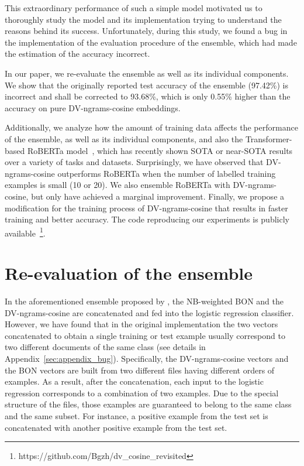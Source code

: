 \documentclass[11pt]{article}
\begin{document}
This extraordinary performance of such a simple model motivated us to thoroughly study the model and its implementation trying to understand the reasons behind its success. Unfortunately, during this study, we found a bug in the implementation of the evaluation procedure of the ensemble, which had made the estimation of the accuracy incorrect.

In our paper, we re-evaluate the ensemble as well as its individual components. We
show that the originally reported test accuracy of the ensemble (97.42\%) is incorrect and shall be corrected to 93.68\%, which is only 0.55\% higher than the accuracy on pure DV-ngrams-cosine embeddings. 

Additionally, we analyze how the amount of training data affects the performance of the ensemble, as well as its individual components, and also the Transformer-based RoBERTa model~\cite{liu2020roberta}, which has recently shown SOTA or near-SOTA results over a variety of tasks and datasets. Surprisingly, we have observed that DV-ngrams-cosine outperforms RoBERTa when the number of labelled training examples is small (10 or 20). We also ensemble RoBERTa with DV-ngrams-cosine, but only have achieved a marginal improvement. Finally, we propose a modification for the training process of DV-ngrams-cosine that results in faster training and better accuracy. The code reproducing our experiments is publicly available~\footnote{https://github.com/Bgzh/dv\_cosine\_revisited}.

\section{Re-evaluation of the ensemble}
\label{sec:ens_n_problem}
In the aforementioned ensemble proposed by \citet{thongtan-phienthrakul-2019-sentiment}, the NB-weighted BON and the DV-ngrams-cosine are concatenated and fed into the logistic regression classifier. 
However, we have found that in the original implementation the two vectors concatenated to obtain a single training or test example usually correspond to two different documents of the same class (see details in Appendix~\ref{sec:appendix_bug}). Specifically, the DV-ngrams-cosine vectors and the BON vectors are built from two different files having different orders of examples. As a result, after the concatenation, each input to the logistic regression corresponds to a combination of two examples. Due to the special structure of the files, those examples are guaranteed to belong to the same class and the same subset. For instance, a positive example from the test set is concatenated with another positive example from the test set. 
\end{document}
